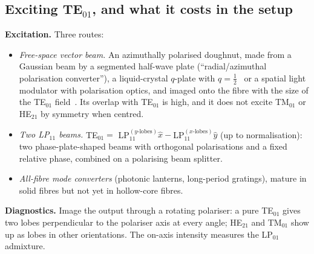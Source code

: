 \documentclass[11pt,a4paper]{article}
\begin{document}
\subsection{Exciting TE$_{01}$, and what it costs in the setup}
\label{sec:te01_setup}
\textbf{Excitation.} Three routes:
\begin{itemize}
\item \emph{Free-space vector beam.} An azimuthally polarised doughnut, made from a Gaussian beam by a segmented half-wave plate (``radial/azimuthal polarisation converter''), a liquid-crystal $q$-plate with $q=\frac12$~\cite{marrucci2006} or a spatial light modulator with polarisation optics, and imaged onto the fibre with the size of the TE$_{01}$ field~\cite{ramachandran2013}. Its overlap with TE$_{01}$ is high, and it does not excite TM$_{01}$ or HE$_{21}$ by symmetry when centred.
\item \emph{Two LP$_{11}$ beams.} TE$_{01}=$ LP$_{11}^{(y\text{-lobes})}\hat x-$LP$_{11}^{(x\text{-lobes})}\hat y$ (up to normalisation): two phase-plate-shaped beams with orthogonal polarisations and a fixed relative phase, combined on a polarising beam splitter.
\item \emph{All-fibre mode converters} (photonic lanterns, long-period gratings), mature in solid fibres but not yet in hollow-core fibres.
\end{itemize}
\textbf{Diagnostics.} Image the output through a rotating polariser: a pure TE$_{01}$ gives two lobes perpendicular to the polariser axis at every angle; HE$_{21}$ and TM$_{01}$ show up as lobes in other orientations. The on-axis intensity measures the LP$_{01}$ admixture.
\end{document}

